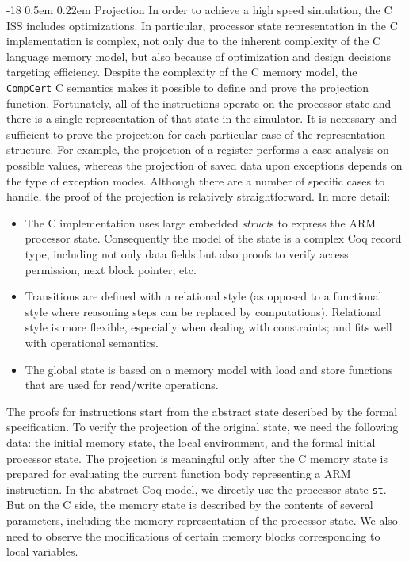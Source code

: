 \documentclass{llncs}
\makeatletter
\newcommand{\compcert}{\texttt{CompCert}\xspace}
\renewcommand\subsubsection{\@startsection{subsubsection}{3}{\z@}%
                       {-18\p@ \@plus -4\p@ \@minus -4\p@}%
                       {0.5em \@plus 0.22em}%
                       {\normalfont\normalsize\bfseries\boldmath}}
\makeatother
\begin{document}
\subsubsection{Projection}
In order to achieve a high speed simulation, the C ISS includes
optimizations. In particular, processor state representation in the C
implementation is complex, not only due to the inherent complexity of
the C language memory model, but also because of optimization and
design decisions targeting efficiency.  Despite the complexity of the
C memory model, the \compcert C semantics makes it possible to define
and prove the projection function. Fortunately, all of the
instructions operate on the processor state and there is a single
representation of that state in the simulator. It is necessary and
sufficient to prove the projection for each particular case of the
representation structure. For example, the projection of a register
performs a case analysis on possible values, whereas the projection of
saved data upon exceptions depends on the type of exception modes.
Although there are a number of specific cases to handle, the proof of
the projection is relatively straightforward.  In more detail:
\begin{itemize}
\item The C implementation uses large embedded \emph{struct}s to
  express the ARM processor state.  Consequently the model of the
  state is a complex Coq record type, including not only data fields
  but also proofs to verify access permission, next block pointer,
  etc.
\item Transitions are defined with a relational style (as opposed to a
  functional style where reasoning steps can be replaced by
  computations).
  Relational style is more flexible,
  especially when dealing with constraints;
  and fits well with operational semantics.
\item The global state is based on a memory model with load
  and store functions that are used for read/write operations.
\end{itemize}

The proofs for instructions start from the abstract state described by
the formal specification.  To verify the projection of the
original state, we need the following data: the initial
memory state, the local environment, and the formal initial processor
state.  The projection is meaningful only after the C memory state is
prepared for evaluating the current function body representing a ARM
instruction.  In the abstract Coq model, we directly use the processor
state \texttt{st}.  But on the C side, the memory state is described
by the contents of several parameters, including the memory representation
of the processor state.  We also need to observe the modifications of
certain memory blocks corresponding to local variables.
\end{document}
